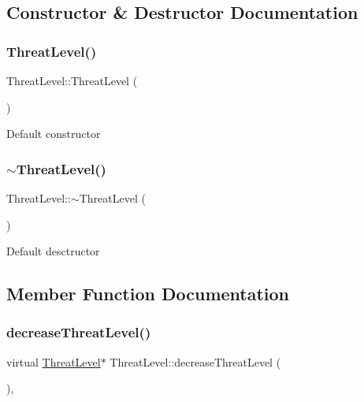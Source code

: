 \subsection{Constructor \& Destructor Documentation}
\mbox{\label{classThreatLevel_a18dc853a3ac3b4db9ec7495dae72f8fb}} 
\subsubsection{\texorpdfstring{Threat\+Level()}{ThreatLevel()}}
{\footnotesize\ttfamily Threat\+Level\+::\+Threat\+Level (\begin{DoxyParamCaption}{ }\end{DoxyParamCaption})\hspace{0.3cm}{\ttfamily [inline]}}

Default constructor \mbox{\label{classThreatLevel_ad69b03a01e63cffeca7656155d4e0849}} 
\subsubsection{\texorpdfstring{$\sim$\+Threat\+Level()}{~ThreatLevel()}}
{\footnotesize\ttfamily Threat\+Level\+::$\sim$\+Threat\+Level (\begin{DoxyParamCaption}{ }\end{DoxyParamCaption})\hspace{0.3cm}{\ttfamily [inline]}}

Default desctructor 

\subsection{Member Function Documentation}
\mbox{\label{classThreatLevel_a3545ec161fbe4c01beafb9b43624c7e8}} 
\subsubsection{\texorpdfstring{decrease\+Threat\+Level()}{decreaseThreatLevel()}}
{\footnotesize\ttfamily virtual \hyperlink{classThreatLevel}{Threat\+Level}$\ast$ Threat\+Level\+::decrease\+Threat\+Level (\begin{DoxyParamCaption}{ }\end{DoxyParamCaption})\hspace{0.3cm}{\ttfamily [inline]}, {\ttfamily [virtual]}}

